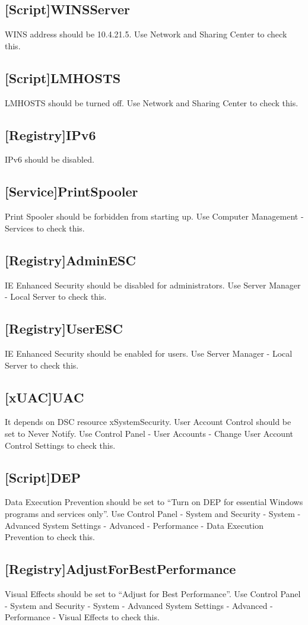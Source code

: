     \subsection{[Script]WINSServer}
      WINS address should be 10.4.21.5. Use Network and Sharing Center to check this.
    \subsection{[Script]LMHOSTS}
      LMHOSTS should be turned off. Use Network and Sharing Center to check this.
    \subsection{[Registry]IPv6}
      IPv6 should be disabled.
    \subsection{[Service]PrintSpooler}
      Print Spooler should be forbidden from starting up. Use Computer Management - Services to check this.
    \subsection{[Registry]AdminESC}
      IE Enhanced Security should be disabled for administrators. Use Server Manager - Local Server to check this.
    \subsection{[Registry]UserESC}
      IE Enhanced Security should be enabled for users. Use Server Manager - Local Server to check this.
    \subsection{[xUAC]UAC}
      It depends on DSC resource xSystemSecurity. User Account Control should be set to Never Notify. Use Control Panel - User Accounts - Change User Account Control Settings to check this.
    \subsection{[Script]DEP}
      Data Execution Prevention should be set to ``Turn on DEP for essential Windows programs and services only''. Use Control Panel - System and Security - System - Advanced System Settings - Advanced - Performance - Data Execution Prevention to check this.
    \subsection{[Registry]AdjustForBestPerformance}
      Visual Effects should be set to ``Adjust for Best Performance''. Use Control Panel - System and Security - System - Advanced System Settings - Advanced - Performance - Visual Effects to check this.
